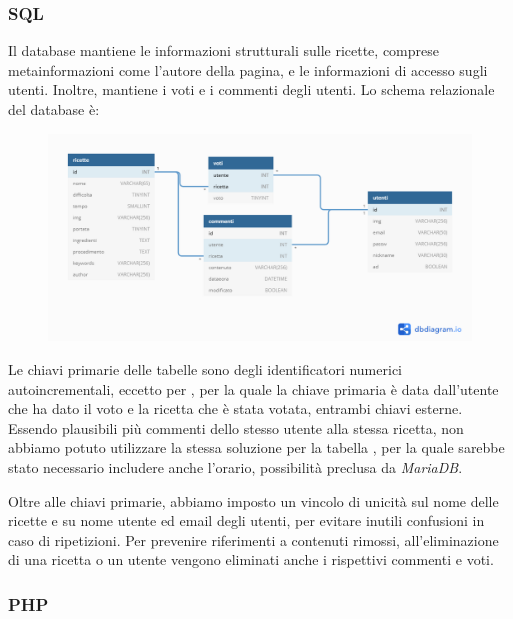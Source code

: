 \subsubsection{SQL}
Il database mantiene le informazioni strutturali sulle ricette, comprese metainformazioni come l'autore della pagina, e le informazioni di accesso sugli utenti.
Inoltre, mantiene i voti e i commenti degli utenti.
Lo schema relazionale del database è:

\begin{figure}[h!]
	\centering
	\includegraphics{img/progettazione/schema-db}
\end{figure}

Le chiavi primarie delle tabelle sono degli identificatori numerici autoincrementali, eccetto per , per la quale la chiave primaria è data dall'utente che ha dato il voto e la ricetta che è stata votata, entrambi chiavi esterne.
Essendo plausibili più commenti dello stesso utente alla stessa ricetta, non abbiamo potuto utilizzare la stessa soluzione per la tabella , per la quale sarebbe stato necessario includere anche l'orario, possibilità preclusa da \textit{MariaDB}.

Oltre alle chiavi primarie, abbiamo imposto un vincolo di unicità sul nome delle ricette e su nome utente ed email degli utenti, per evitare inutili confusioni in caso di ripetizioni.
Per prevenire riferimenti a contenuti rimossi, all'eliminazione di una ricetta o un utente vengono eliminati anche i rispettivi commenti e voti.

\subsubsection{PHP}\label{subs:php}
